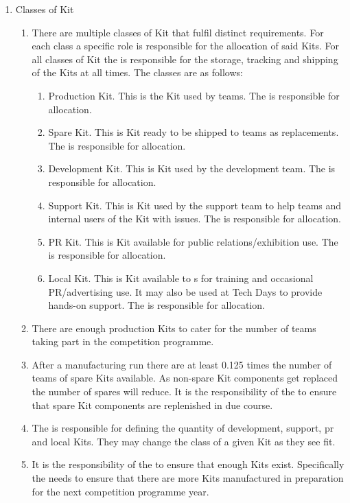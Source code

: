\begin{draft}
\begin{enumerate}
\item Classes of Kit
  \begin{enumerate}
    \item There are multiple classes of Kit that fulfil distinct requirements. For each class a specific role is responsible for the allocation of said Kits. For all classes of Kit the  is responsible for the storage, tracking and shipping of the Kits at all times. The classes are as follows:
      \begin{enumerate}
        \item Production Kit. This is the Kit used by teams. The  is responsible for allocation.
        \item Spare Kit. This is Kit ready to be shipped to teams as replacements. The  is responsible for allocation.
        \item Development Kit. This is Kit used by the development team.  The  is responsible for allocation.
        \item Support Kit. This is Kit used by the support team to help teams and internal users of the Kit with issues. The  is responsible for allocation.
        \item PR Kit. This is Kit available for public relations/exhibition use. The  is responsible for allocation.
        \item Local Kit. This is Kit available to s for training and occasional PR/advertising use. It may also be used at Tech Days to provide hands-on support. The  is responsible for allocation.
      \end{enumerate}
    \item There are enough production Kits to cater for the number of teams taking part in the competition programme.
    \item After a manufacturing run there are at least 0.125 times the number of teams of spare Kits available. As non-spare Kit components get replaced the number of spares will reduce. It is the responsibility of the  to ensure that spare Kit components are replenished in due course.
    \item The  is responsible for defining the quantity of development, support, pr and local Kits. They may change the class of a given Kit as they see fit.
    \item It is the responsibility of the  to ensure that enough Kits exist. Specifically the  needs to ensure that there are more Kits manufactured in preparation for the next competition programme year.
  \end{enumerate}
\end{enumerate}
\end{draft}
